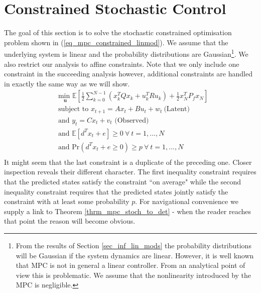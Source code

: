 \section{Constrained Stochastic Control}
The goal of this section is to solve the stochastic constrained optimisation problem shown in (\ref{eq_mpc_constrained_linmod}). We assume that the underlying system is linear and the probability distributions are Gaussian\footnote{From the results of Section \ref{sec_inf_lin_mods} the probability distributions will be Gaussian if the system dynamics are linear. However, it is well known \cite{mac} that MPC is not in general a linear controller. From an analytical point of view this is problematic. We assume that the nonlinearity introduced by the MPC is negligible.}. We also restrict our analysis to affine constraints. Note that we only include one constraint in the succeeding analysis however, additional constraints are handled in exactly the same way as we will show.
\begin{equation}
\begin{aligned}
&\underset{\mathbf{u}}{\text{min }} \mathbb{E}\left[ \frac{1}{2}\sum_{k=0}^{N-1} \left( x_k^TQx_k + u_k^TRu_k \right) + \frac{1}{2}x_N^TP_fx_N \right] \\
& \text{subject to } x_{t+1}=Ax_t+Bu_t + w_t~\text{(Latent)} \\
& \text{and } y_{t}= Cx_t + v_t \text{ (Observed)}\\
& \text{and } \mathbb{E}[d^Tx_t + e] \geq 0 ~\forall ~t=1,...,N \\
& \text{and } \text{Pr}(d^Tx_t + e \geq 0) \geq p ~\forall ~t=1,...,N\\
\end{aligned}
\label{eq_mpc_constrained_linmod}
\end{equation}
It might seem that the last constraint is a duplicate of the preceding one. Closer inspection reveals their different character. The first inequality constraint requires that the predicted states satisfy the constraint ``on average" while the second inequality constraint requires that the predicted states jointly satisfy the constraint with at least some probability $p$. For navigational convenience we supply a link to Theorem \ref{thrm_mpc_stoch_to_det} - when the reader reaches that point the reason will become obvious.

